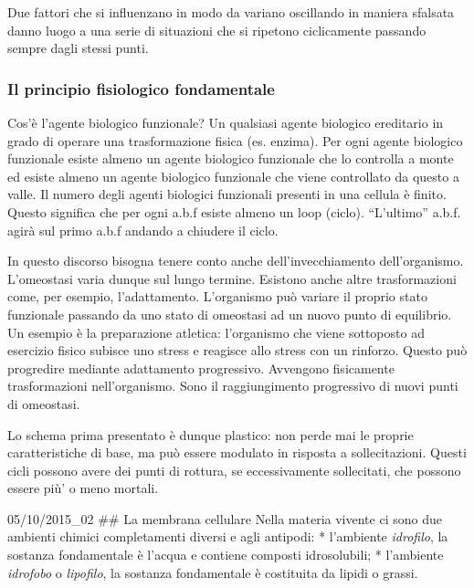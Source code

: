 \documentclass[]{article}
\begin{document}
Due fattori che si influenzano in modo da variano oscillando in maniera
sfalsata danno luogo a una serie di situazioni che si ripetono
ciclicamente passando sempre dagli stessi punti.

\subsubsection{Il principio fisiologico
fondamentale}\label{il-principio-fisiologico-fondamentale}

Cos'è l'agente biologico funzionale? Un qualsiasi agente biologico
ereditario in grado di operare una trasformazione fisica (es. enzima).
Per ogni agente biologico funzionale esiste almeno un agente biologico
funzionale che lo controlla a monte ed esiste almeno un agente biologico
funzionale che viene controllato da questo a valle. Il numero degli
agenti biologici funzionali presenti in una cellula è finito. Questo
significa che per ogni a.b.f esiste almeno un loop (ciclo). ``L'ultimo''
a.b.f. agirà sul primo a.b.f andando a chiudere il ciclo.

In questo discorso bisogna tenere conto anche dell'invecchiamento
dell'organismo. L'omeostasi varia dunque sul lungo termine. Esistono
anche altre trasformazioni come, per esempio, l'adattamento. L'organismo
può variare il proprio stato funzionale passando da uno stato di
omeostasi ad un nuovo punto di equilibrio. Un esempio è la preparazione
atletica: l'organismo che viene sottoposto ad esercizio fisico subisce
uno stress e reagisce allo stress con un rinforzo. Questo può progredire
mediante adattamento progressivo. Avvengono fisicamente trasformazioni
nell'organismo. Sono il raggiungimento progressivo di nuovi punti di
omeostasi.

Lo schema prima presentato è dunque plastico: non perde mai le proprie
caratteristiche di base, ma può essere modulato in risposta a
sollecitazioni. Questi cicli possono avere dei punti di rottura, se
eccessivamente sollecitati, che possono essere più' o meno mortali.

05/10/2015\_02 \#\# La membrana cellulare Nella materia vivente ci sono
due ambienti chimici completamenti diversi e agli antipodi: * l'ambiente
\emph{idrofilo}, la sostanza fondamentale è l'acqua e contiene composti
idrosolubili; * l'ambiente \emph{idrofobo} o \emph{lipofilo}, la
sostanza fondamentale è costituita da lipidi o grassi.
\end{document}
